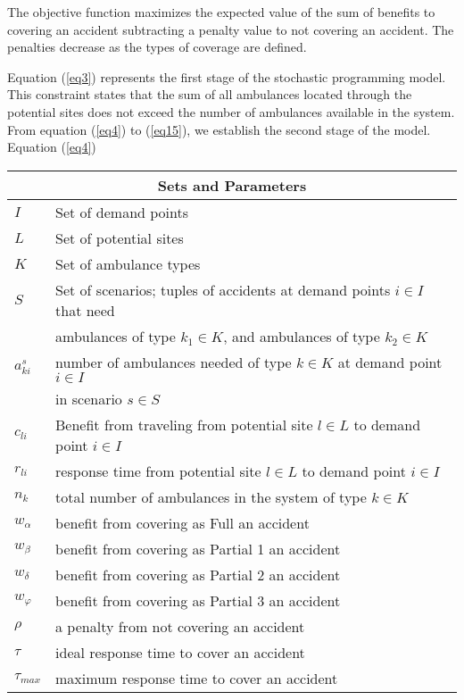 The objective function maximizes the expected value of the sum of benefits to covering an accident subtracting a penalty value to not covering an accident. The penalties decrease as the types of coverage are defined.

Equation (\ref{eq3}) represents the first stage of the stochastic programming model. This constraint states that the sum of all ambulances located through the potential sites does not exceed the number of ambulances available in the system. From equation (\ref{eq4}) to (\ref{eq15}), we establish the second stage of the model. Equation (\ref{eq4}) 





\begin{table}[h]
\centering
\begin{tabular}{ll}
\hline
\multicolumn{2}{c}{Sets and Parameters}                                                                         \\ \hline
$I$          & Set of demand points                            \\
$L$          & Set of potential sites                         \\
$K$          & Set of ambulance types                         \\
$S$      & Set of scenarios; tuples of accidents at demand points $i \in I$ that need \\
         & ambulances of type $k_1 \in K$, and ambulances of type $k_2 \in K$           \\
$a_{ki}^s$ & number of ambulances needed of type $k \in K$ at demand point $ i \in I$    \\
             & in scenario $s \in S$                          \\
$c_{li}$ & Benefit from traveling from potential site $l \in L$ to demand point $i \in I$   \\
$r_{li}$ & response time from potential site $l \in L$ to demand point $i \in I$       \\
$n_k$    & total number of ambulances in the system of type $k \in K$                  \\
$w_\alpha$   & benefit from covering as Full an accident      \\
$w_\beta$    & benefit from covering as Partial 1 an accident \\
$w_\delta$   & benefit from covering as Partial 2 an accident \\
$w_\varphi$  & benefit from covering as Partial 3 an accident \\
$\rho$       & a penalty from not covering an accident          \\
$\tau$       &    ideal response time to cover an accident                                            \\
$\tau_{max}$ &     maximum response time to cover an accident                                           \\ \hline


\end{tabular}
\end{table}
